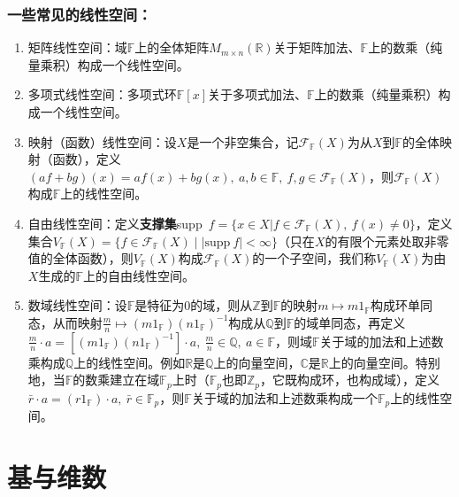\documentclass[zihao=-4,UTF8]{report}
\theoremstyle{mystyle} %
\begin{document}
\subsubsection{一些常见的线性空间：}
\begin{enumerate}
    \item 矩阵线性空间：域$\mathbb{F}$上的全体矩阵$M_{m\times n}(\mathbb{R})$关于矩阵加法、$\mathbb{F}$上的数乘（纯量乘积）构成一个线性空间。
    \item 多项式线性空间：多项式环$\mathbb{F}[x]$关于多项式加法、$\mathbb{F}$上的数乘（纯量乘积）构成一个线性空间。
    \item 映射（函数）线性空间：设$X$是一个非空集合，记$\mathcal{F}_{\mathbb{F}}(X)$为从$X$到$\mathbb{F}$的全体映射（函数），定义$(af + bg)(x) = af(x)+bg(x),\ a,b\in \mathbb{F},\ f,g \in \mathcal{F}_{\mathbb{F}}(X)$，则$\mathcal{F}_{\mathbb{F}}(X)$构成$\mathbb{F}$上的线性空间。
    \item 自由线性空间：定义\textbf{支撑集}supp\ $f=\{x\in X| f \in \mathcal{F}_{\mathbb{F}}(X),\ f(x) \ne 0 \}$，定义集合$V_{\mathbb{F}}(X) = \{f \in \mathcal{F}_{\mathbb{F}}(X)\mid |\text{supp}\ f|< \infty\}$（只在$X$的有限个元素处取非零值的全体函数），则$V_{\mathbb{F}}(X)$构成$\mathcal{F}_{\mathbb{F}}(X)$的一个子空间，我们称$V_{\mathbb{F}}(X)$为由$X$生成的$\mathbb{F}$上的自由线性空间。
    \item 数域线性空间：设$\mathbb{F}$是特征为0的域，则从$\mathbb{Z}$到$\mathbb{F}$的映射$m\longmapsto m1_{\mathbb{F}}$构成环单同态，从而映射$\frac{m}{n}\longmapsto (m1_{\mathbb{F}})(n1_{\mathbb{F}})^{-1}$构成从$\mathbb{Q}$到$\mathbb{F}$的域单同态，再定义$\frac{m}{n}\cdot a =[(m1_{\mathbb{F}})(n1_{\mathbb{F}})^{-1}]\cdot a,\ \frac{m}{n}\in \mathbb{Q},\ a\in \mathbb{F} $，则域$\mathbb{F}$关于域的加法和上述数乘构成$\mathbb{Q}$上的线性空间。{\color{gray}\small 例如$\mathbb{R}$是$\mathbb{Q}$上的向量空间，$\mathbb{C}$是$\mathbb{R}$上的向量空间。}特别地，当$\mathbb{F}$的数乘建立在域$\mathbb{F}_p$上时（$\mathbb{F}_p$也即$\mathbb{Z}_p$，它既构成环，也构成域），定义$\bar{r}\cdot a = (r1_{\mathbb{F}})\cdot a,\ \bar{r}\in \mathbb{F}_p$，则$\mathbb{F}$关于域的加法和上述数乘构成一个$\mathbb{F}_p$上的线性空间。
\end{enumerate}


\section{基与维数}
\end{document}
